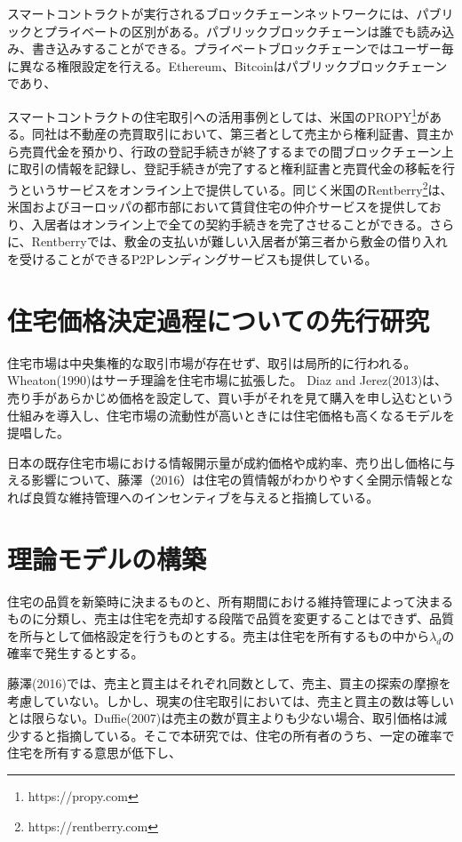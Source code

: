 \documentclass[a4paper,10.5pt]{jlreq}
\begin{document}
スマートコントラクトが実行されるブロックチェーンネットワークには、パブリックとプライベートの区別がある。パブリックブロックチェーンは誰でも読み込み、書き込みすることができる。プライベートブロックチェーンではユーザー毎に異なる権限設定を行える。Ethereum、Bitcoinはパブリックブロックチェーンであり、


スマートコントラクトの住宅取引への活用事例としては、米国のPROPY\footnote{https://propy.com}がある。同社は不動産の売買取引において、第三者として売主から権利証書、買主から売買代金を預かり、行政の登記手続きが終了するまでの間ブロックチェーン上に取引の情報を記録し、登記手続きが完了すると権利証書と売買代金の移転を行うというサービスをオンライン上で提供している。同じく米国のRentberry\footnote{https://rentberry.com}は、米国およびヨーロッパの都市部において賃貸住宅の仲介サービスを提供しており、入居者はオンライン上で全ての契約手続きを完了させることができる。さらに、Rentberryでは、敷金の支払いが難しい入居者が第三者から敷金の借り入れを受けることができるP2Pレンディングサービスも提供している。


\section{住宅価格決定過程についての先行研究}
住宅市場は中央集権的な取引市場が存在せず、取引は局所的に行われる。
Wheaton(1990)はサーチ理論を住宅市場に拡張した。
Diaz and Jerez(2013)は、売り手があらかじめ価格を設定して、買い手がそれを見て購入を申し込むという仕組みを導入し、住宅市場の流動性が高いときには住宅価格も高くなるモデルを提唱した。

日本の既存住宅市場における情報開示量が成約価格や成約率、売り出し価格に与える影響について、藤澤（2016）は住宅の質情報がわかりやすく全開示情報となれば良質な維持管理へのインセンティブを与えると指摘している。
\section{理論モデルの構築}
住宅の品質を新築時に決まるものと、所有期間における維持管理によって決まるものに分類し、売主は住宅を売却する段階で品質を変更することはできず、品質を所与として価格設定を行うものとする。売主は住宅を所有するもの中から$\lambda_{d}$の確率で発生するとする。

藤澤(2016)では、売主と買主はそれぞれ同数として、売主、買主の探索の摩擦を考慮していない。しかし、現実の住宅取引においては、売主と買主の数は等しいとは限らない。Duffie(2007)は売主の数が買主よりも少ない場合、取引価格は減少すると指摘している。そこで本研究では、住宅の所有者のうち、一定の確率で住宅を所有する意思が低下し、
\end{document}
